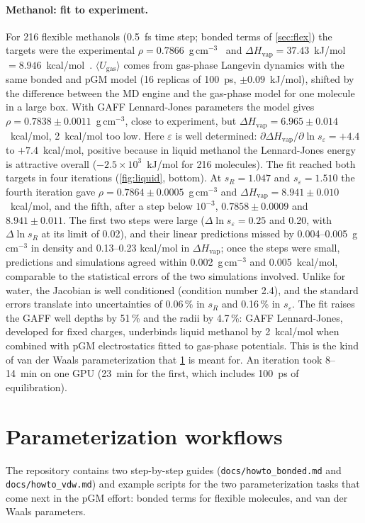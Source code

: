 \documentclass[11pt]{article}
\newcommand{\code}[1]{\texttt{#1}}
\newcommand{\Hvap}{\Delta H_\mathrm{vap}}
\begin{document}
\paragraph{Methanol: fit to experiment.}
For 216 flexible methanols (0.5~fs time step; bonded terms of \cref{sec:flex}) the targets were
the experimental $\rho=0.7866$~g\,cm$^{-3}$~\cite{srivastava1987methanol} and
$\Hvap=37.43$~kJ/mol $=8.946$~kcal/mol~\cite{polak1971hvap}. $\langle U_\mathrm{gas}\rangle$ comes from
gas-phase Langevin dynamics with the same bonded and pGM model (16 replicas of 100~ps,
$\pm0.09$~kJ/mol), shifted by the difference between the MD engine and the gas-phase model for one
molecule in a large box. With GAFF Lennard-Jones parameters the model gives
$\rho=0.7838\pm0.0011$~g\,cm$^{-3}$, close to experiment, but $\Hvap=6.965\pm0.014$~kcal/mol, 2~kcal/mol
too low. Here $\varepsilon$ is well determined: $\partial\Hvap/\partial\ln s_\varepsilon=+4.4$ to
$+7.4$~kcal/mol, positive because in liquid methanol the Lennard-Jones energy is attractive overall
($-2.5\times10^3$~kJ/mol for 216 molecules). The fit reached both targets in four iterations (\cref{fig:liquid}, bottom). At $s_R=1.047$ and
$s_\varepsilon=1.510$ the fourth iteration gave $\rho=0.7864\pm0.0005$~g\,cm$^{-3}$ and
$\Hvap=8.941\pm0.010$~kcal/mol, and the fifth, after a step below $10^{-3}$, $0.7858\pm0.0009$ and
$8.941\pm0.011$. The first two steps were large ($\Delta\ln s_\varepsilon=0.25$ and 0.20, with
$\Delta\ln s_R$ at its limit of 0.02), and their linear predictions missed by 0.004--0.005~g\,cm$^{-3}$ in density and 0.13--0.23
kcal/mol in $\Hvap$; once the steps were small, predictions and simulations agreed within
0.002~g\,cm$^{-3}$ and 0.005~kcal/mol, comparable to the statistical errors of the two simulations
involved. Unlike for water, the Jacobian is well conditioned (condition number 2.4), and the
standard errors translate into uncertainties of 0.06\,\% in $s_R$ and 0.16\,\% in $s_\varepsilon$.
The fit raises the GAFF well depths by 51\,\% and the radii by 4.7\,\%: GAFF Lennard-Jones,
developed for fixed charges, underbinds liquid methanol by 2~kcal/mol when combined with pGM
electrostatics fitted to gas-phase potentials. This is the kind of van der Waals
parameterization that \cref{sec:workflows} is meant for. An iteration took 8--14~min on one GPU
(23~min for the first, which includes 100~ps of equilibration).

\section{Parameterization workflows}\label{sec:workflows}
The repository contains two step-by-step guides (\code{docs/howto\_bonded.md} and
\code{docs/howto\_vdw.md}) and example scripts for the two parameterization tasks that come next in
the pGM effort: bonded terms for flexible molecules, and van der Waals parameters.
\end{document}
